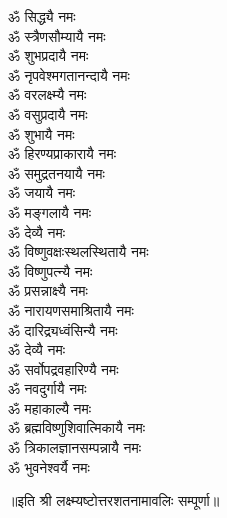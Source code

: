 \begin{multicols}{2}
\begin{flushleft}
ॐ सिद्ध्यै नमः\\
ॐ स्त्रैणसौम्यायै नमः\\
ॐ शुभप्रदायै नमः\\
ॐ नृपवेश्मगतानन्दायै नमः\\
ॐ वरलक्ष्म्यै नमः\\
ॐ वसुप्रदायै नमः\hfill{}\\
ॐ शुभायै नमः\\
ॐ हिरण्यप्राकारायै नमः\\
ॐ समुद्रतनयायै नमः\\
ॐ जयायै नमः\\
ॐ मङ्गलायै नमः\\
ॐ देव्यै नमः\\
ॐ विष्णुवक्षःस्थलस्थितायै नमः\\
ॐ विष्णुपत्न्यै नमः\\
ॐ प्रसन्नाक्ष्यै नमः\\
ॐ नारायणसमाश्रितायै नमः\hfill{}\\
ॐ दारिद्र्यध्वंसिन्यै नमः\\
ॐ देव्यै नमः\\
ॐ सर्वोपद्रवहारिण्यै नमः\\
ॐ नवदुर्गायै नमः\\
ॐ महाकाल्यै नमः\\
ॐ ब्रह्मविष्णुशिवात्मिकायै नमः\\
ॐ त्रिकालज्ञानसम्पन्नायै नमः\\
ॐ भुवनेश्वर्यै नमः\\
\end{flushleft}
\end{multicols}
\centerline{॥इति श्री लक्ष्म्यष्टोत्तरशतनामावलिः सम्पूर्णा॥}
